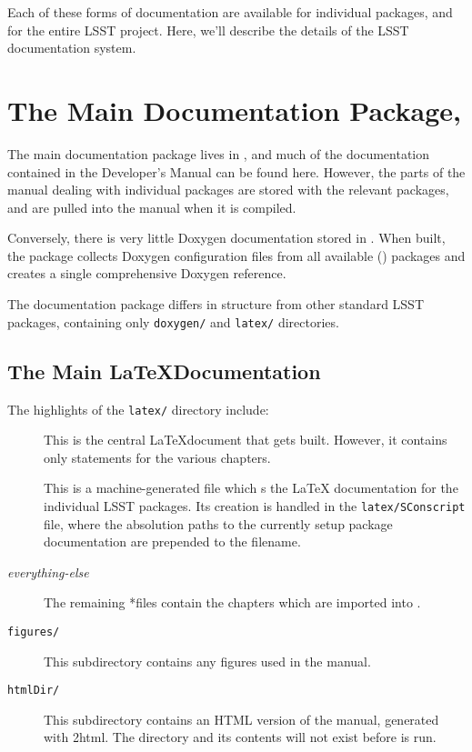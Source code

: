 Each of these forms of documentation are available for individual
packages, and for the entire LSST project.  Here, we'll describe the
details of the LSST documentation system.


\section{The Main Documentation Package, \ttdevenvdoc\label{sec-maindoc}}

The main documentation package lives in \ttdevenvdoc, and much
of the documentation contained in the Developer's Manual can be found
here.  However, the parts of the manual dealing with individual
packages are stored with the relevant packages, and are pulled into
the manual when it is compiled.

Conversely, there is very little Doxygen documentation stored in
\ttdevenvdoc.  When built, the package collects Doxygen
configuration files from all available (\ttsetup) packages and creates a
single comprehensive Doxygen reference.

The documentation package differs in structure from other standard
LSST packages, containing only \texttt{doxygen/} and \texttt{latex/}
directories.

\subsection{The Main \LaTeX Documentation\label{sec-mainlatex}}

The highlights of the \texttt{latex/} directory include:

\begin{description}
  \item [\ttlsstmanual] This is the central \LaTeX document that gets
    built.  However, it contains only \ttinput
    statements for the various chapters.
  \item [\ttlsstpackages] This is a machine-generated file which
    \ttinput s the \LaTeX{} documentation for the
    individual LSST packages.  Its creation is handled in the
    \texttt{latex/SConscript} file, where the absolution paths to the
    currently setup package documentation are prepended to the
    \ttinput filename.
  \item [{\itshape everything-else}\tttex] The remaining
    *\tttex files contain the chapters which are imported
    into \ttlsstmanual.
  \item[\texttt{figures/}] This subdirectory contains any figures
    used in the manual.
  \item[\texttt{htmlDir/}] This subdirectory contains an HTML
    version of the manual, generated with \ttlatex2html.  The
    directory and its contents will not exist before \ttscons is
    run.
\end{description}

